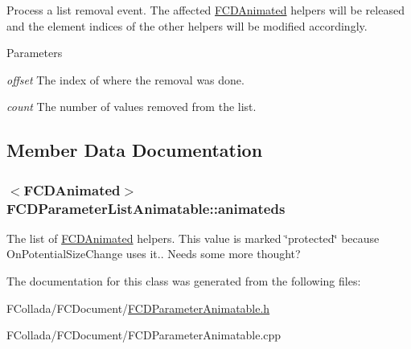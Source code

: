 \label{classFCDParameterListAnimatable_a4d691c5060728861b49b63b64ccff98c}
Process a list removal event. The affected \hyperlink{classFCDAnimated}{FCDAnimated} helpers will be released and the element indices of the other helpers will be modified accordingly. 
\begin{DoxyParams}{Parameters}
\item[{\em offset}]The index of where the removal was done. \item[{\em count}]The number of values removed from the list. \end{DoxyParams}


\subsection{Member Data Documentation}
\hypertarget{classFCDParameterListAnimatable_a145430d7d71b81045b718a6ec935202a}{
\subsubsection[{animateds}]{$<${\bf FCDAnimated}$>$ {\bf FCDParameterListAnimatable::animateds}}}
\label{classFCDParameterListAnimatable_a145430d7d71b81045b718a6ec935202a}
The list of \hyperlink{classFCDAnimated}{FCDAnimated} helpers. This value is marked \char`\"{}protected\char`\"{} because OnPotentialSizeChange uses it.. Needs some more thought? 

The documentation for this class was generated from the following files:\begin{DoxyCompactItemize}
\item 
FCollada/FCDocument/\hyperlink{FCDParameterAnimatable_8h}{FCDParameterAnimatable.h}\item 
FCollada/FCDocument/FCDParameterAnimatable.cpp\end{DoxyCompactItemize}

